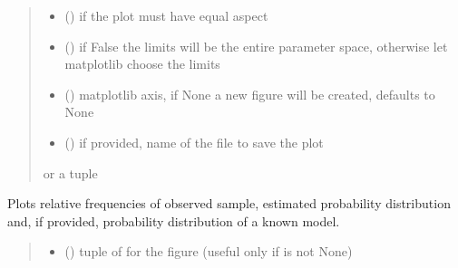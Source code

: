 \documentclass[letterpaper,10pt,english]{sphinxmanual}
\begin{document}
\begin{fulllineitems}
\begin{fulllineitems}
\begin{quote}
\begin{description}
\begin{itemize}
\item {} 
\sphinxAtStartPar
{} () \textendash{} if the plot must have equal aspect

\item {} 
\sphinxAtStartPar
{} () \textendash{} if False the limits will be the entire parameter space, otherwise let matplotlib choose the limits

\item {} 
\sphinxAtStartPar
{} (\sphinxstyleliteralemphasis{\sphinxupquote{, }}) \textendash{} matplotlib axis, if None a new figure will be created, defaults to None

\item {} 
\sphinxAtStartPar
{} () \textendash{} if provided, name of the file to save the plot

\end{itemize}

\sphinxAtStartPar
{} or a tuple 

\end{description}\end{quote}

\end{fulllineitems}


\begin{fulllineitems}
\label{\detokenize{cubmods:cubmods.cub.CUBresCUB00.plot_ordinal}}
\pysigstartsignatures
{}
\pysigstopsignatures
\sphinxAtStartPar
Plots relative frequencies of observed sample, estimated probability distribution and,
if provided, probability distribution of a known model.
\begin{quote}\begin{description}
\begin{itemize}
\item {} 
\sphinxAtStartPar
{} () \textendash{} tuple of  for the figure (useful only if  is not None)


\end{itemize}
\end{description}
\end{quote}
\end{fulllineitems}
\end{fulllineitems}
\end{document}
